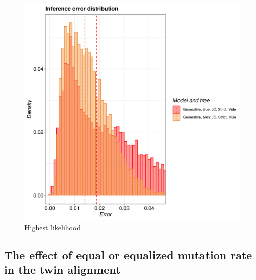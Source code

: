 \begin{figure}[H]
  \includegraphics[width=\textwidth]{pirouette_example_23/example_23_318/errors.png}
  \caption{Highest likelihood}
\end{figure}

\subsection{The effect of equal or equalized mutation rate in the twin alignment}

